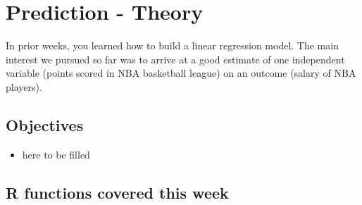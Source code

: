 \documentclass[
]{book}
\providecommand{\tightlist}{%
  \setlength{\itemsep}{0pt}\setlength{\parskip}{0pt}}
\begin{document}
\hypertarget{pm-t}{%
\chapter{Prediction - Theory}\label{pm-t}}

In prior weeks, you learned how to build a linear regression model. The main interest
we pursued so far was to arrive at a good estimate of one independent variable (points scored in NBA basketball league) on an outcome (salary of NBA players).

\hypertarget{objectives-8}{%
\section{Objectives}\label{objectives-8}}

\begin{itemize}
\tightlist
\item
  here to be filled
\end{itemize}

\hypertarget{r-functions-covered-this-week-3}{%
\section{R functions covered this week}\label{r-functions-covered-this-week-3}}
\end{document}
